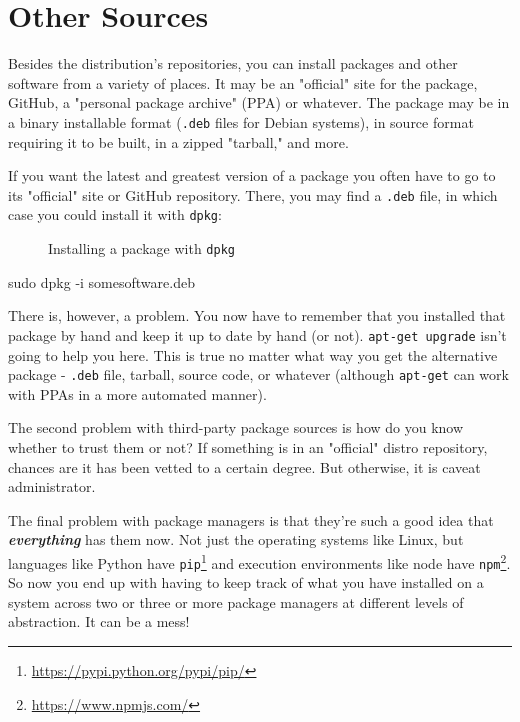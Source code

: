 \documentclass[10pt,american,]{book}
\makeatletter
\newenvironment{Shaded}{\begin{snugshade}}{\end{snugshade}}
\newcommand{\KeywordTok}[1]{\textcolor[rgb]{0.13,0.29,0.53}{\textbf{{#1}}}}
\newcommand{\NormalTok}[1]{{#1}}
\renewcommand{\href}[2]{#2\footnote{\url{#1}}}
\numberwithin{figure}{chapter}
\DeclareRobustCommand{\drcap}[1]{\begin{figure}[H]\caption{#1}\end{figure}}
\DeclareRobustCommand{\drcmd}[1]{\index{commands!#1@\texttt{#1}}}
\renewcommand{\KeywordTok}[1]{{#1}}
\renewcommand{\NormalTok}[1]{{#1}}
\makeatother
\begin{document}
\section*{Other Sources}\label{other-sources}

Besides the distribution's repositories, you can install packages and
other software from a variety of places. It may be an "official" site
for the package, GitHub, a "personal package archive" (PPA) or whatever.
The package may be in a binary installable format (\texttt{.deb}
files for Debian systems), in source format requiring it to be built, in
a zipped "tarball," and more.

If you want the latest and greatest version of a package you often have
to go to its "official" site or GitHub repository. There, you may find a
\texttt{.deb} file, in which case you could install it with
\texttt{dpkg}\drcmd{dpkg}:

\drcap{Installing a package with \texttt{dpkg}}

\begin{Shaded}
\begin{Highlighting}[]
\KeywordTok{sudo} \NormalTok{dpkg -i somesoftware.deb}
\end{Highlighting}
\end{Shaded}

There is, however, a problem. You now have to remember that you
installed that package by hand and keep it up to date by hand (or not).
\texttt{apt-get\ upgrade} isn't going to help you here. This is true no
matter what way you get the alternative package - \texttt{.deb} file,
tarball, source code, or whatever (although \texttt{apt-get} can work
with PPAs in a more automated manner).

The second problem with third-party package sources is how do you know
whether to trust them or not? If something is in an "official" distro
repository, chances are it has been vetted to a certain degree. But
otherwise, it is caveat administrator.

The final problem with package managers is that they're such a good idea
that \textbf{\emph{everything}} has them now. Not just the operating
systems like Linux, but languages like Python have
\href{https://pypi.python.org/pypi/pip/}{\texttt{pip}} and execution
environments like node have \href{https://www.npmjs.com/}{\texttt{npm}}.
So now you end up with having to keep track of what you have installed
on a system across two or three or more package managers at different
levels of abstraction. It can be a mess!
\end{document}
